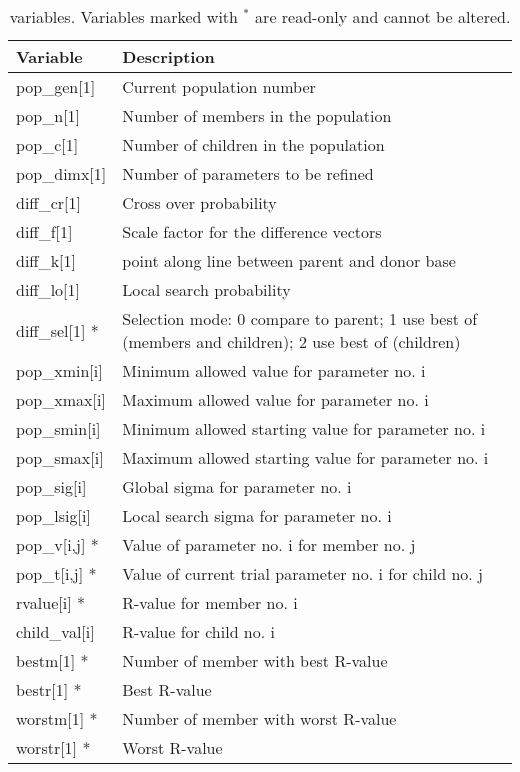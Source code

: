 \begin{table}[!tb]
\centering
\begin{tabularx}{\textwidth}{|p{30mm}|X|}
  \hline
  {\bf Variable} & {\bf Description} \\
  \hline \hline
  pop\_gen[1]    &  Current population number \\
  pop\_n[1]      &  Number of members in the population\\
  pop\_c[1]      &  Number of children in the population\\
  pop\_dimx[1]   &  Number of parameters to be refined  \\
  \hline 
  diff\_cr[1]     &  Cross over probability\\
  diff\_f[1]      &  Scale factor for the difference vectors\\
  diff\_k[1]      &  point along line between parent and donor base\\
  diff\_lo[1]     &  Local search probability\\
  diff\_sel[1] *  &  Selection mode: 0 compare to parent;
                     1 use best of (members and children);
                     2 use best of (children)\\
  \hline \hline
  pop\_xmin[i]   &  Minimum allowed value for parameter no. i  \\
  pop\_xmax[i]   &  Maximum allowed value for parameter no. i  \\
  pop\_smin[i]   &  Minimum allowed starting value for parameter no. i  \\
  pop\_smax[i]   &  Maximum allowed starting value for parameter no. i  \\
  pop\_sig[i]    &  Global sigma for parameter no. i  \\
  pop\_lsig[i]   &  Local search sigma for parameter no. i  \\
  \hline \hline
  pop\_v[i,j] *  &  Value of parameter no. i for member no. j  \\
  pop\_t[i,j] *  &  Value of current trial parameter no. i for child no. j  \\
  rvalue[i] *    &  R-value for member no. i\\
  child\_val[i]  &  R-value for child no. i\\
  bestm[1] *     &  Number of member with best R-value\\
  bestr[1] *     &  Best R-value\\
  worstm[1] *    &  Number of member with worst R-value\\
  worstr[1] *    &  Worst R-value\\
  \hline
\end{tabularx}
\caption[\Diffev structural variables]
        {\label{v1-tab}\Diffev variables. Variables marked
         with $^{*}$ are read-only and cannot be altered.}
\end{table}


